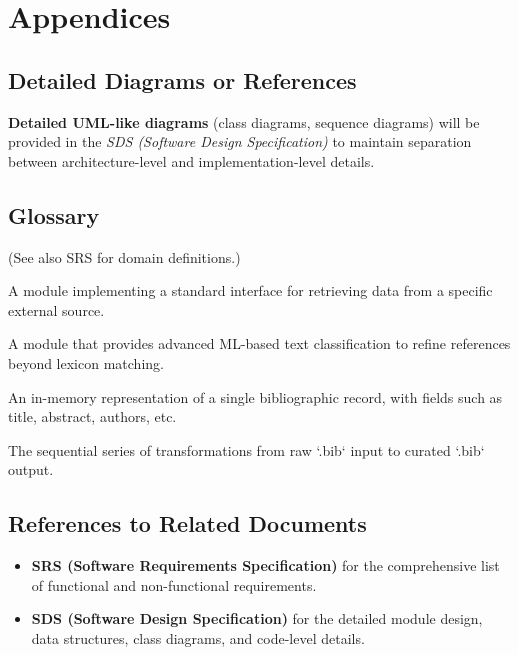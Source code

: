 \documentclass[12pt]{article}
\begin{document}
\section{Appendices}

\subsection{Detailed Diagrams or References}
\textbf{Detailed UML-like diagrams} (class diagrams, sequence diagrams) will be provided in the \emph{SDS (Software Design Specification)} to maintain separation between architecture-level and implementation-level details. 

\subsection{Glossary}
(See also SRS for domain definitions.)

\begin{description}[style=nextline]
  \item[Scraper Plugin] A module implementing a standard interface for retrieving data from a specific external source.
  \item[Classifier Plugin] A module that provides advanced ML-based text classification to refine references beyond lexicon matching.
  \item[Reference Object] An in-memory representation of a single bibliographic record, with fields such as title, abstract, authors, etc.
  \item[Data Pipeline] The sequential series of transformations from raw `.bib` input to curated `.bib` output.
\end{description}

\subsection{References to Related Documents}
\begin{itemize}
  \item \textbf{SRS (Software Requirements Specification)} for the comprehensive list of functional and non-functional requirements.
  \item \textbf{SDS (Software Design Specification)} for the detailed module design, data structures, class diagrams, and code-level details.
\end{itemize}
\end{document}
